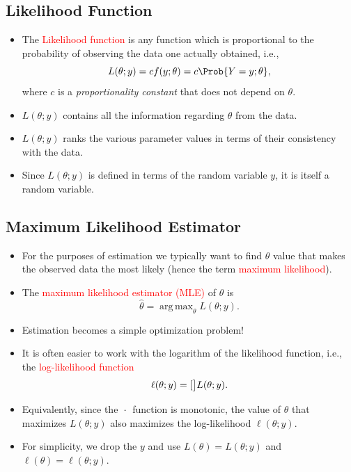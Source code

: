 \documentclass[oneside]{book}\usepackage[]{graphicx}\usepackage[svgnames]{xcolor}
\let\log\relax%
\DeclareMathOperator*{\argmax}{arg\,max}
\begin{document}
\subsection*{Likelihood Function}
\begin{itemize}
      \item The \textcolor{Red}{Likelihood function} is any function which is proportional to the probability
            of observing the data one actually obtained, i.e.,
            \[ L(\theta;y)=cf(y;\theta)=c\Prob{Y=y;\theta}, \]
            where $ c $ is a \emph{proportionality constant} that does not depend on $ \theta $.
      \item $ L(\theta;y) $ contains all the information regarding $ \theta $ from the data.
      \item $ L(\theta;y) $ ranks the various parameter values in terms of their consistency
            with the data.
      \item Since $ L(\theta;y) $ is defined in terms of the random variable $ y $, it is itself a
            random variable.
\end{itemize}
\subsection*{Maximum Likelihood Estimator}
\begin{itemize}
      \item For the purposes of estimation we typically want to find $ \theta $ value that makes the
            observed data the most likely (hence the term \textcolor{Red}{maximum likelihood}).
      \item The \textcolor{Red}{maximum likelihood estimator (MLE)} of $ \theta $ is
            \[ \hat{\theta}=\argmax_\theta L(\theta;y). \]
      \item Estimation becomes a simple optimization problem!
      \item It is often easier to work with the logarithm of the likelihood function, i.e., the
            \textcolor{Red}{log-likelihood function}
            \[ \ell(\theta;y)=\log[\big]{L(\theta;y)}. \]
      \item Equivalently, since the $ \log{\:\cdot\:} $ function is monotonic, the value of $ \theta $ that maximizes $ L(\theta;y) $ also
            maximizes the log-likelihood $ \ell(\theta;y) $.
      \item For simplicity, we drop the $ y $ and use $ L(\theta)=L(\theta;y) $ and $ \ell(\theta)=\ell(\theta;y) $.
\end{itemize}
\end{document}
